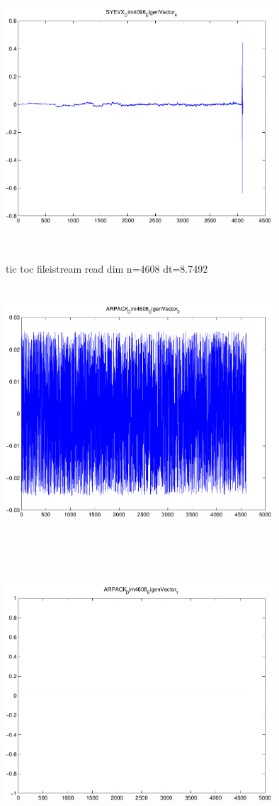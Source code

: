 \documentclass[9pt]{article}
\theoremstyle{plain}
\theoremstyle{definition}
\theoremstyle{remark}
\numberwithin{equation}{section}
\begin{document}
\includegraphics[width=10.0cm,height=10.0cm]{SYEVX_Dim4096_EigenVector_4.pdf}

tic toc fileistream read dim n=4608 dt=8.7492
\includegraphics[width=10.0cm,height=10.0cm]{ARPACK_Dim4608_EigenVector_0.pdf}

\includegraphics[width=10.0cm,height=10.0cm]{ARPACK_Dim4608_EigenVector_1.pdf}
\end{document}
